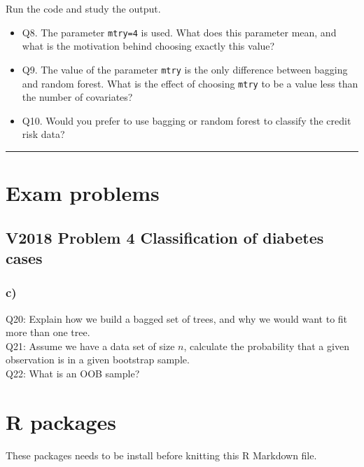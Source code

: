 \documentclass[]{article}
\providecommand{\tightlist}{%
  \setlength{\itemsep}{0pt}\setlength{\parskip}{0pt}}
\begin{document}
Run the code and study the output.

\begin{itemize}
\tightlist
\item
  Q8. The parameter \texttt{mtry=4} is used. What does this parameter
  mean, and what is the motivation behind choosing exactly this value?
\item
  Q9. The value of the parameter \texttt{mtry} is the only difference
  between bagging and random forest. What is the effect of choosing
  \texttt{mtry} to be a value less than the number of covariates?
\item
  Q10. Would you prefer to use bagging or random forest to classify the
  credit risk data?
\end{itemize}

\begin{center}\rule{0.5\linewidth}{\linethickness}\end{center}

\hypertarget{exam-problems}{%
\section{Exam problems}\label{exam-problems}}

\hypertarget{v2018-problem-4-classification-of-diabetes-cases}{%
\subsection{V2018 Problem 4 Classification of diabetes
cases}\label{v2018-problem-4-classification-of-diabetes-cases}}

\hypertarget{c}{%
\subsubsection{c)}\label{c}}

Q20: Explain how we build a bagged set of trees, and why we would want
to fit more than one tree.\\
Q21: Assume we have a data set of size \(n\), calculate the probability
that a given observation is in a given bootstrap sample.\\
Q22: What is an OOB sample?

\hypertarget{r-packages}{%
\section{R packages}\label{r-packages}}

These packages needs to be install before knitting this R Markdown file.
\end{document}
